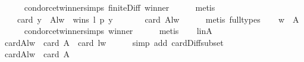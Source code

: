\begin{isabellebody}
\ \ \ \ \isamarkupfalse%
\ condorcet{\isacharunderscore}{\kern0pt}winner{\isachardot}{\kern0pt}simps\ finite{\isacharunderscore}{\kern0pt}Diff\ winner\isanewline
\ \ \ \ \isamarkupfalse%
\ metis\isanewline
\ \ \isamarkupfalse%
\ {}\ {}\ \isamarkupfalse%
\ {}{\isacharcolon}{\kern0pt}\isanewline
\ \ \ \ {\isachardoublequoteopen}card\ {\isacharbraceleft}{\kern0pt}y\ {\isasymin}\ A{\isacharminus}{\kern0pt}{\isacharbraceleft}{\kern0pt}l{\isacharcomma}{\kern0pt}w{\isacharbraceright}{\kern0pt}\ {\isachardot}{\kern0pt}\ wins\ l\ p\ y{\isacharbraceright}{\kern0pt}\ {\isasymle}\isanewline
\ \ \ \ \ \ card\ {\isacharparenleft}{\kern0pt}A{\isacharminus}{\kern0pt}{\isacharbraceleft}{\kern0pt}l{\isacharcomma}{\kern0pt}w{\isacharbraceright}{\kern0pt}{\isacharparenright}{\kern0pt}{\isachardoublequoteclose}\isanewline
\ \ \ \ \isamarkupfalse%
\ {\isacharparenleft}{\kern0pt}metis\ {\isacharparenleft}{\kern0pt}full{\isacharunderscore}{\kern0pt}types{\isacharparenright}{\kern0pt}{\isacharparenright}{\kern0pt}\isanewline
\ \ \isamarkupfalse%
\ {\isachardoublequoteopen}w\ {\isasymin}\ A{\isachardoublequoteclose}\isanewline
\ \ \ \ \isamarkupfalse%
\ condorcet{\isacharunderscore}{\kern0pt}winner{\isachardot}{\kern0pt}simps\ winner\isanewline
\ \ \ \ \isamarkupfalse%
\ metis\isanewline
\ \ \isamarkupfalse%
\ l{\isacharunderscore}{\kern0pt}in{\isacharunderscore}{\kern0pt}A\isanewline
\ \ \isamarkupfalse%
\ {\isachardoublequoteopen}card{\isacharparenleft}{\kern0pt}A{\isacharminus}{\kern0pt}{\isacharbraceleft}{\kern0pt}l{\isacharcomma}{\kern0pt}w{\isacharbraceright}{\kern0pt}{\isacharparenright}{\kern0pt}\ {\isacharequal}{\kern0pt}\ card\ A\ {\isacharminus}{\kern0pt}\ card\ {\isacharbraceleft}{\kern0pt}l{\isacharcomma}{\kern0pt}w{\isacharbraceright}{\kern0pt}{\isachardoublequoteclose}\isanewline
\ \ \ \ \isamarkupfalse%
\ {\isacharparenleft}{\kern0pt}simp\ add{\isacharcolon}{\kern0pt}\ card{\isacharunderscore}{\kern0pt}Diff{\isacharunderscore}{\kern0pt}subset{\isacharparenright}{\kern0pt}\isanewline
\ \ \isamarkupfalse%
\ {\isachardoublequoteopen}card{\isacharparenleft}{\kern0pt}A{\isacharminus}{\kern0pt}{\isacharbraceleft}{\kern0pt}l{\isacharcomma}{\kern0pt}w{\isacharbraceright}{\kern0pt}{\isacharparenright}{\kern0pt}\ {\isacharequal}{\kern0pt}\ card\ A\ {\isacharminus}{\kern0pt}\ {}{\isachardoublequoteclose}\isanewline
\ \ \ \ \isamarkupfalse%

\end{isabellebody}
